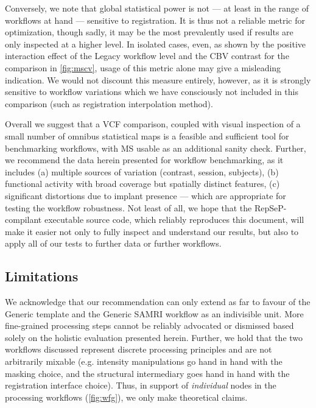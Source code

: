 Conversely, we note that global statistical power is not --- at least in the range of workflows at hand --- sensitive to registration.
It is thus not a reliable metric for optimization, though sadly, it may be the most prevalently used if results are only inspected at a higher level.
In isolated cases, even, as shown by the positive interaction effect of the Legacy workflow level and the CBV contrast for the comparison in \cref{fig:mscv}, usage of this metric alone may give a misleading indication.
We would not discount this measure entirely, however, as it is strongly sensitive to workflow variations which we have consciously not included in this comparison (such as registration interpolation method).

Overall we suggest that a VCF comparison, coupled with visual inspection of a small number of omnibus statistical maps is a feasible and sufficient tool for benchmarking workflows, with MS usable as an additional sanity check.
Further, we recommend the data herein presented for workflow benchmarking, as it includes (a) multiple sources of variation (contrast, session, subjects), (b) functional activity with broad coverage but spatially distinct features, (c) significant distortions due to implant presence --- which are appropriate for testing the workflow robustness.
Not least of all, we hope that the RepSeP-compilant executable source code, which reliably reproduces this document, will make it easier not only to fully inspect and understand our results, but also to apply all of our tests to further data or further workflows.

\subsection{Limitations}

We acknowledge that our recommendation can only extend as far to favour of the Generic template and the Generic SAMRI workflow as an indivisible unit.
More fine-grained processing steps cannot be reliably advocated or dismissed based solely on the holistic evaluation presented herein.
Further, we hold that the two workflows discussed represent discrete processing principles and are not arbitrarily mixable (e.g. intensity manipulations go hand in hand with the masking choice, and the structural intermediary goes hand in hand with the registration interface choice).
Thus, in support of \textit{individual} nodes in the processing workflows (\cref{fig:wfg}), we only make theoretical claims.
